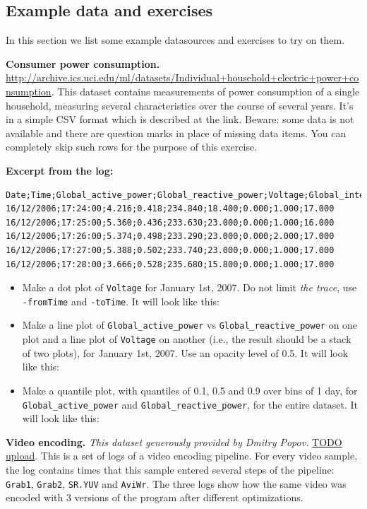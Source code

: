 \documentclass{article}
\begin{document}
\pagebreak
\subsection{Example data and exercises}
In this section we list some example datasources and exercises to try on them.

\textbf{Consumer power consumption.} \url{http://archive.ics.uci.edu/ml/datasets/Individual+household+electric+power+consumption}. This dataset contains measurements of power consumption of a single household, measuring several characteristics over the course of several years. It's in a simple CSV format which is described at the link. Beware: some data is not available and there are question marks in place of missing data items. You can completely skip such rows for the purpose of this exercise.

\textbf{Excerpt from the log:}
\begin{verbatim}
Date;Time;Global_active_power;Global_reactive_power;Voltage;Global_intensity;Sub_metering_1;Sub_metering_2;Sub_metering_3
16/12/2006;17:24:00;4.216;0.418;234.840;18.400;0.000;1.000;17.000
16/12/2006;17:25:00;5.360;0.436;233.630;23.000;0.000;1.000;16.000
16/12/2006;17:26:00;5.374;0.498;233.290;23.000;0.000;2.000;17.000
16/12/2006;17:27:00;5.388;0.502;233.740;23.000;0.000;1.000;17.000
16/12/2006;17:28:00;3.666;0.528;235.680;15.800;0.000;1.000;17.000
\end{verbatim}

\begin{itemize}
 \item Make a dot plot of \verb|Voltage| for January 1st, 2007. Do not limit \emph{the trace}, use \verb|-fromTime| and \verb|-toTime|. It will look like this: 
 \item Make a line plot of \verb|Global_active_power| vs \verb|Global_reactive_power| on one plot and a line plot of \verb|Voltage| on another (i.e., the result should be a stack of two plots), for January 1st, 2007. Use an opacity level of 0.5. It will look like this: 
 \item Make a quantile plot, with quantiles of 0.1, 0.5 and 0.9 over bins of 1 day, for \verb|Global_active_power| and \verb|Global_reactive_power|, for the entire dataset. It will look like this: 
\end{itemize}

\textbf{Video encoding.} \emph{This dataset generously provided by Dmitry Popov.} \url{TODO upload}. This is a set of logs of a video encoding pipeline. For every video sample, the log contains times that this sample entered several steps of the pipeline: \verb|Grab1|, \verb|Grab2|, \verb|SR.YUV| and \verb|AviWr|. The three logs show how the same video was encoded with 3 versions of the program after different optimizations.
\end{document}
